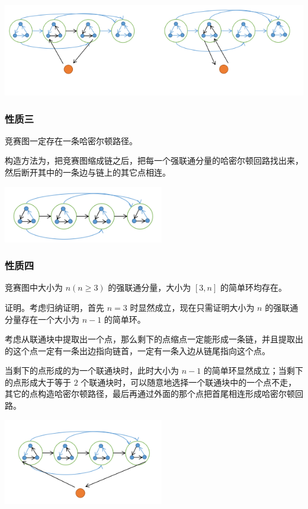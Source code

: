 \documentclass[UTF-8]{ctexart}
\begin{document}
	\begin{center}
		\includegraphics[width=15cm]{file//hamiltonian1.png}
	\end{center}

	\subsubsection{性质三}
	竞赛图一定存在一条哈密尔顿路径。
	
	构造方法为，把竞赛图缩成链之后，把每一个强联通分量的哈密尔顿回路找出来，然后断开其中的一条边与链上的其它点相连。
	
	\begin{center}
		\includegraphics[width=7cm]{file//hamiltonian2.png}
	\end{center}
	
	\subsubsection{性质四}
	竞赛图中大小为 $n(n\ge3)$ 的强联通分量，大小为 $[3,n]$ 的简单环均存在。
	
	证明。考虑归纳证明，首先 $n=3$ 时显然成立，现在只需证明大小为 $n$ 的强联通分量存在一个大小为 $n-1$ 的简单环。
	
	考虑从联通块中提取出一个点，那么剩下的点缩点一定能形成一条链，并且提取出的这个点一定有一条出边指向链首，一定有一条入边从链尾指向这个点。
	
	当剩下的点形成的为一个联通块时，此时大小为 $n-1$ 的简单环显然成立；当剩下的点形成大于等于 $2$ 个联通块时，可以随意地选择一个联通块中的一个点不走，其它的点构造哈密尔顿路径，最后再通过外面的那个点把首尾相连形成哈密尔顿回路。
	
	\begin{center}
		\includegraphics[width=7cm]{file//hamiltonian3.png}
	\end{center}
	
\end{document}
